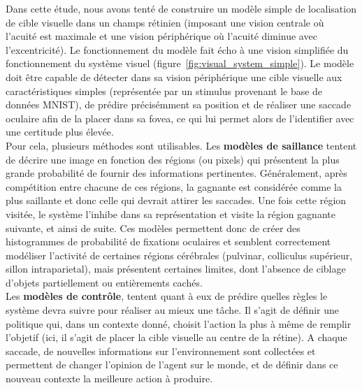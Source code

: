 Dans cette étude, nous avons tenté de construire un modèle simple de localisation de cible visuelle dans un champs rétinien (imposant une vision centrale où l'acuité est maximale et une vision périphérique où l'acuité diminue avec l'excentricité). Le fonctionnement du modèle fait écho à une vision simplifiée du fonctionnement du système visuel (figure~\ref{fig:visual_system_simple}).
Le modèle doit être capable de détecter dans sa vision périphérique une cible visuelle aux caractéristiques simples (représentée par un stimulus provenant le base de données MNIST), de prédire précisémment sa position et de réaliser une saccade oculaire afin de la placer dans sa fovea, ce qui lui permet alors de l'identifier avec une certitude plus élevée.\autocite{Zhaoping2014} \\
Pour cela, plusieurs méthodes sont utilisables.
Les \textbf{modèles de saillance} tentent de décrire une image en fonction des régions (ou pixels) qui présentent la plus grande probabilité de fournir des informations pertinentes. Généralement, après compétition entre chacune de ces régions, la gagnante est considérée comme la plus saillante et donc celle qui devrait attirer les saccades. Une fois cette région visitée, le système l'inhibe dans sa représentation et visite la région gagnante suivante, et ainsi de suite. Ces modèles permettent donc de créer des histogrammes de probabilité de fixations oculaires et semblent correctement modéliser l'activité de certaines régions cérébrales (pulvinar, colliculus supérieur, sillon intraparietal), mais présentent certaines limites, dont l'absence de ciblage d'objets partiellement ou entièrements cachés\autocite{Butko2010, Itti2000}.\\
Les \textbf{modèles de contrôle}, tentent quant à eux de prédire quelles règles le système devra suivre pour réaliser au mieux une tâche. Il s'agit de définir une politique qui, dans un contexte donné, choisit l'action la plus à même de remplir l'objetif (ici, il s'agit de placer la cible visuelle au centre de la rétine).
A chaque saccade, de nouvelles informations sur l'environnement sont collectées et permettent de changer l'opinion de l'agent sur le monde, et de définir dans ce nouveau contexte la meilleure action à produire\autocite{Butko2010}.\\
